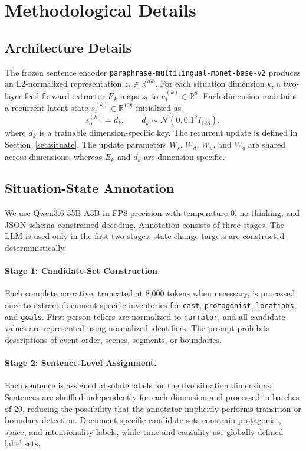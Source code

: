\documentclass[11pt]{article}
\begin{document}
\section{Methodological Details}
\label{app:method-details}

\subsection{Architecture Details}
\label{app:architecture-details}

The frozen sentence encoder \texttt{paraphrase-multilingual-mpnet-base-v2} produces an L2-normalized representation $z_t\in\mathbb{R}^{768}$. For each situation dimension $k$, a two-layer feed-forward extractor $E_k$ maps $z_t$ to $u_t^{(k)}\in\mathbb{R}^{8}$. Each dimension maintains a recurrent latent state $s_t^{(k)}\in\mathbb{R}^{128}$ initialized as
\begin{equation}
s_0^{(k)}=d_k,
\qquad
d_k\sim\mathcal{N}(0,0.1^2I_{128}),
\end{equation}
where $d_k$ is a trainable dimension-specific key. The recurrent update is defined in Section~\ref{sec:situate}. The update parameters $W_s$, $W_d$, $W_u$, and $W_g$ are shared across dimensions, whereas $E_k$ and $d_k$ are dimension-specific.

\subsection{Situation-State Annotation}
\label{:annotation-details}

We use Qwen3.6-35B-A3B in FP8 precision with temperature $0$, no thinking, and JSON-schema-constrained decoding. Annotation consists of three stages. The LLM is used only in the first two stages; state-change targets are constructed deterministically.

\paragraph{Stage 1: Candidate-Set Construction.}
Each complete narrative, truncated at 8,000 tokens when necessary, is processed once to extract document-specific inventories for \texttt{cast}, \texttt{protagonist}, \texttt{locations}, and \texttt{goals}. First-person tellers are normalized to \texttt{narrator}, and all candidate values are represented using normalized identifiers. The prompt prohibits descriptions of event order, scenes, segments, or boundaries.

\paragraph{Stage 2: Sentence-Level Assignment.}
Each sentence is assigned absolute labels for the five situation dimensions. Sentences are shuffled independently for each dimension and processed in batches of 20, reducing the possibility that the annotator implicitly performs transition or boundary detection. Document-specific candidate sets constrain protagonist, space, and intentionality labels, while time and causality use globally defined label sets.
\end{document}
